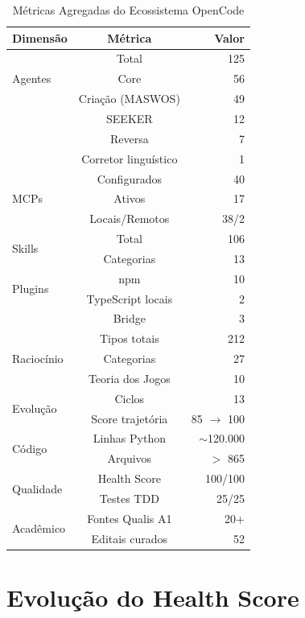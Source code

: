 \documentclass[12pt,a4paper,sumario=tradicional]{abntex2}
\begin{document}
\begin{longtable}{@{}lcr@{}}
\caption{Métricas Agregadas do Ecossistema OpenCode}\\
\toprule
\textbf{Dimensão} & \textbf{Métrica} & \textbf{Valor} \\
\midrule
\multirow{3}{*}{Agentes} & Total & 125 \\
 & Core & 56 \\
 & Criação (MASWOS) & 49 \\
 & SEEKER & 12 \\
 & Reversa & 7 \\
 & Corretor linguístico & 1 \\
\midrule
\multirow{3}{*}{MCPs} & Configurados & 40 \\
 & Ativos & 17 \\
 & Locais/Remotos & 38/2 \\
\midrule
\multirow{2}{*}{Skills} & Total & 106 \\
 & Categorias & 13 \\
\midrule
\multirow{2}{*}{Plugins} & npm & 10 \\
 & TypeScript locais & 2 \\
 & Bridge & 3 \\
\midrule
\multirow{3}{*}{Raciocínio} & Tipos totais & 212 \\
 & Categorias & 27 \\
 & Teoria dos Jogos & 10 \\
\midrule
\multirow{2}{*}{Evolução} & Ciclos & 13 \\
 & Score trajetória & 85 $\to$ 100 \\
\midrule
\multirow{2}{*}{Código} & Linhas Python & $\sim$120.000 \\
 & Arquivos & $>$ 865 \\
\midrule
\multirow{2}{*}{Qualidade} & Health Score & 100/100 \\
 & Testes TDD & 25/25 \\
\midrule
\multirow{2}{*}{Acadêmico} & Fontes Qualis A1 & 20+ \\
 & Editais curados & 52 \\
\bottomrule
\end{longtable}

\section{Evolução do Health Score}
\end{document}
